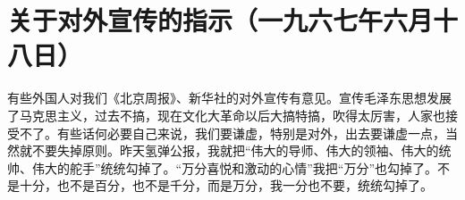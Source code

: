 \section[关于对外宣传的指示（一九六七午六月十八日）]{关于对外宣传的指示（一九六七午六月十八日）}


有些外国人对我们《北京周报》、新华社的对外宣传有意见。宣传毛泽东思想发展了马克思主义，过去不搞，现在文化大革命以后大搞特搞，吹得太厉害，人家也接受不了。有些话何必要自己来说，我们要谦虚，特别是对外，出去要谦虚一点，当然就不要失掉原则。昨天氢弹公报，我就把“伟大的导师、伟大的领袖、伟大的统帅、伟大的舵手”统统勾掉了。“万分喜悦和激动的心情”我把“万分”也勾掉了。不是十分，也不是百分，也不是千分，而是万分，我一分也不要，统统勾掉了。


